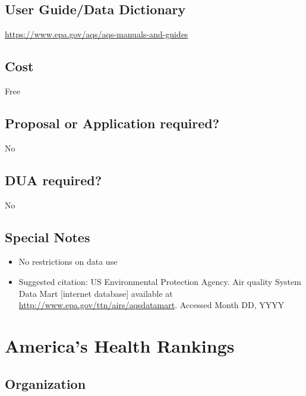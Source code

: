 \documentclass[
]{book}
\providecommand{\tightlist}{%
  \setlength{\itemsep}{0pt}\setlength{\parskip}{0pt}}
\begin{document}
\hypertarget{user-guidedata-dictionary-1}{%
\section{User Guide/Data Dictionary}\label{user-guidedata-dictionary-1}}

\url{https://www.epa.gov/aqs/aqs-manuals-and-guides}

\hypertarget{cost-1}{%
\section{Cost}\label{cost-1}}

Free

\hypertarget{proposal-or-application-required-1}{%
\section{Proposal or Application required?}\label{proposal-or-application-required-1}}

No

\hypertarget{dua-required-1}{%
\section{DUA required?}\label{dua-required-1}}

No

\hypertarget{special-notes-1}{%
\section{Special Notes}\label{special-notes-1}}

\begin{itemize}
\tightlist
\item
  No restrictions on data use
\item
  Suggested citation: US Environmental Protection Agency. Air quality System Data Mart {[}internet database{]} available at \url{http://www.epa.gov/ttn/airs/aqsdatamart}. Accessed Month DD, YYYY
\end{itemize}

\mainmatter

\hypertarget{americas-health-rankings}{%
\chapter{America's Health Rankings}\label{americas-health-rankings}}

\hypertarget{organization-2}{%
\section{Organization}\label{organization-2}}
\end{document}
